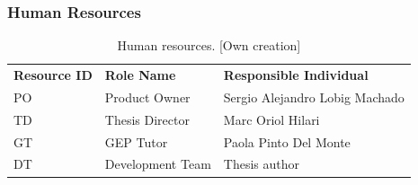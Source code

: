 \subsubsection{Human Resources}
\label{sec:human-resources}

\vspace{-5pt}
\begin{table}[H]
    \centering
    \footnotesize
    \renewcommand{\arraystretch}{1.2}
    \setlength{\arrayrulewidth}{0.8pt}
    \begin{tabular}{>{\centering\arraybackslash}p{2.5cm} >{\centering\arraybackslash}p{3.5cm} p{7cm}}
        \rowcolor{gray!40}  
        \textbf{Resource ID} & 
        \textbf{Role Name} & 
        \textbf{Responsible Individual} \\ 
        \rowcolor{gray!05}
        PO & Product Owner & Sergio Alejandro Lobig Machado \\ 
        \rowcolor{gray!05}
        TD & Thesis Director & Marc Oriol Hilari \\ 
        \rowcolor{gray!05}
        GT & GEP Tutor & Paola Pinto Del Monte \\ 
        \rowcolor{gray!05}
        DT & Development Team & Thesis author \\ 
    \end{tabular}
    \caption[ Human resources]
    {Human resources. [Own creation]} 
    \vspace{-1em}
    \label{table:human-resources-table} 
\end{table}
\vspace{-10pt}
